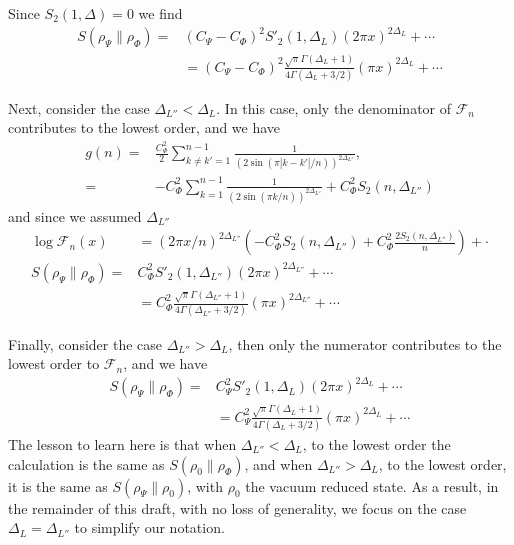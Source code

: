 \documentclass[11pt]{article}
\newcommand{\nn}{\nonumber}
\newcommand{\lb}{\left(}
\newcommand{\rb}{\right)}
\newcommand{\JM}[1]{\textcolor{orange}{#1}}
\begin{document}
Since $S_2(1,\Delta)=0$ we find
\begin{align}
S(\rho_\Psi\|\rho_\Phi)
=&
(C_\Psi-C_\Phi)^2 S'_2(1,\Delta_L)(2\pi x)^{2\Delta_L}+\cdots \nn\\
&=(C_\Psi-C_\Phi)^2\frac{\sqrt{\pi}\Gamma(\Delta_{L}+1)}{4\Gamma(\Delta_{L}+3/2)}(\pi x)^{2\Delta_L}+\cdots
\end{align}

Next, consider the case $\Delta_{L''}<\Delta_L$. In this case, only the denominator of $\mathcal{F}_n$ contributes to the lowest order, and we have
  \begin{align}\label{gnw1p}
    g(n)= & \frac{C_\Phi^2}{2}\sum_{k\neq k'=1}^{n-1}\frac{1}{(2\sin(\pi |k-k'|/n))^{2\Delta_{L''}}}, \nn\\%
    =&-C_\Phi^2\sum_{k=1}^{n-1}\frac{1}{(2\sin(\pi k/n))^{2\Delta_{L''}}}+C_\Phi^2 S_2(n,\Delta_{L''})
  \end{align}
and since we assumed $\Delta_{L''}$
\begin{align}
  \log\mathcal{F}_n(x)&=(2\pi x/n)^{2\Delta_{L''}}\lb -C_\Phi^2 S_2(n,\Delta_{L''})+C_\Phi^2 \frac{2S_2(n,\Delta_{L''})}{n}\rb+\cdot\nn\\
S(\rho_\Psi\|\rho_\Phi)
=&
C_\Phi^2 S'_2(1,\Delta_{L''})(2\pi x)^{2\Delta_{L''}}+\cdots \nn\\
&=C_\Phi^2\frac{\sqrt{\pi}\Gamma(\Delta_{L''}+1)}{4\Gamma(\Delta_{L''}+3/2)}(\pi x)^{2\Delta_{L''}}+\cdots
\end{align}

Finally, consider the case $\Delta_{L''}>\Delta_L$, then only the numerator contributes to the lowest order to $\mathcal{F}_n$, and we have
\begin{align}
S(\rho_\Psi\|\rho_\Phi)
=&
C_\Psi^2 S'_2(1,\Delta_{L})(2\pi x)^{2\Delta_{L}}+\cdots \nn\\
&=C_\Psi^2\frac{\sqrt{\pi}\Gamma(\Delta_{L}+1)}{4\Gamma(\Delta_{L}+3/2)}(\pi x)^{2\Delta_{L}}+\cdots
\end{align}
The lesson to learn here is that when $\Delta_{L''}<\Delta_{L}$, to the lowest order the calculation is the same as $S(\rho_0\|\rho_\Phi)$, and when $\Delta_{L''}>\Delta_L$, to the lowest order, it is the same as $S(\rho_\Psi\|\rho_0)$, with $\rho_0$ the vacuum reduced state. As a result, in the remainder of this draft, with no loss of generality, we focus on the case $\Delta_L=\Delta_{L''}$ to simplify our notation. 
\end{document}
